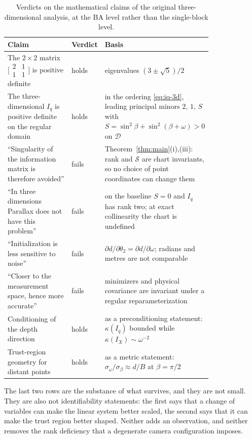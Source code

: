 \documentclass[11pt,a4paper]{article}
\theoremstyle{definition}
\theoremstyle{remark}
\begin{document}
\begin{table}[t]
\centering
\caption{Verdicts on the mathematical claims of the original three-dimensional analysis, at the BA level rather than the single-block level.}
\label{tab:claims}
\small
\begin{tabular}{>{\raggedright\arraybackslash}p{0.33\linewidth}l>{\raggedright\arraybackslash}p{0.47\linewidth}}
\toprule
Claim & Verdict & Basis \\
\midrule
The $2\times2$ matrix $\bigl[\begin{smallmatrix}2&1\\1&1\end{smallmatrix}\bigr]$ is positive definite & holds & eigenvalues $(3\pm\sqrt5)/2$ \\
The three-dimensional $I_q$ is positive definite on the regular domain & holds & in the ordering \eqref{eq:iq-3d}, leading principal minors $2,\,1,\,S$ with $S=\sin^{2}\beta+\sin^{2}(\beta+\omega)>0$ on $\mathcal D$ \\
``Singularity of the information matrix is therefore avoided'' & fails & Theorem~\ref{thm:main}(i),(iii): rank and $\mathcal S$ are chart invariants, so no choice of point coordinates can change them \\
``In three dimensions Parallax does not have this problem'' & fails & on the baseline $S=0$ and $I_q$ has rank two; at exact collinearity the chart is undefined \\
``Initialization is less sensitive to noise'' & fails & $\partial d/\partial\theta_2=\partial d/\partial\omega$; radians and metres are not comparable \\
``Closer to the measurement space, hence more accurate'' & fails & minimizers and physical covariance are invariant under a regular reparameterization \\
\midrule
Conditioning of the depth direction & holds & as a preconditioning statement: $\kappa(I_q)$ bounded while $\kappa(I_X)\sim\omega^{-2}$ \\
Trust-region geometry for distant points & holds & as a metric statement: $\sigma_\omega/\sigma_\beta\approx d/B$ at $\beta=\pi/2$ \\
\bottomrule
\end{tabular}
\end{table}

The last two rows are the substance of what survives, and they are not small. They are also not identifiability statements: the first says that a change of variables can make the linear system better scaled, the second says that it can make the trust region better shaped. Neither adds an observation, and neither removes the rank deficiency that a degenerate camera configuration imposes.
\end{document}
